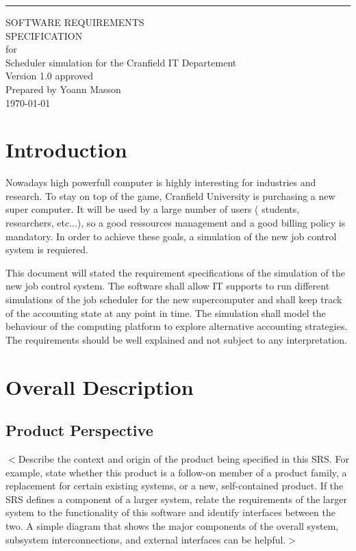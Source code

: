 \documentclass{scrreprt}
\date{}
\def\myversion{1.0 }
\begin{document}
\begin{flushright}
    \rule{16cm}{5pt}\vskip1cm
    \begin{bfseries}
        \Huge{SOFTWARE REQUIREMENTS\\ SPECIFICATION}\\
        \vspace{1.9cm}
        for\\
        \vspace{1.9cm}
        Scheduler simulation for the Cranfield IT Departement\\
        \vspace{1.9cm}
        \LARGE{Version \myversion approved}\\
        \vspace{1.9cm}
        Prepared by Yoann Masson\\
        \today\\
    \end{bfseries}
\end{flushright}

\tableofcontents

\chapter{Introduction}

Nowadays high powerfull computer is highly interesting for industries and research. To stay on top of the game, Cranfield University is purchasing a new super computer. It will be used by a large number of users ( students, researchers, etc...), so a good ressources management and a good billing policy is mandatory. In order to achieve these goals, a simulation of the new job control system is requiered. 

This document will stated the requirement specifications of the simulation of the new job control system. The software shall allow IT supports to run different simulations of the job scheduler for the new supercomputer and shall keep track of the accounting state at any point in time. The simulation shall model the behaviour of the computing platform to explore alternative accounting strategies.
The requirements should be well explained and not subject to any interpretation.



\chapter{Overall Description}

\section{Product Perspective}
$<$Describe the context and origin of the product being specified in this SRS.  
For example, state whether this product is a follow-on member of a product 
family, a replacement for certain existing systems, or a new, self-contained 
product. If the SRS defines a component of a larger system, relate the 
requirements of the larger system to the functionality of this software and 
identify interfaces between the two. A simple diagram that shows the major 
components of the overall system, subsystem interconnections, and external 
interfaces can be helpful.$>$
\end{document}
